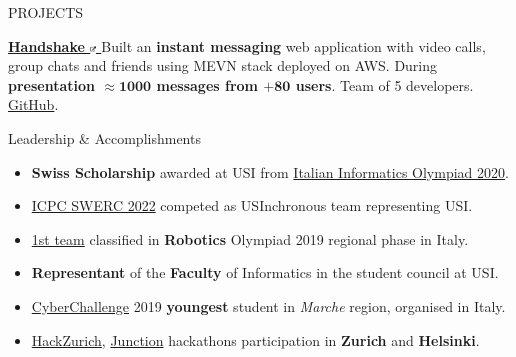 \documentclass{cv} %
\def\intraexpvspace{0.15cm}
\begin{document}
\begin{minipage}[b][0.9\paperheight][t]{0.7\linewidth}
\begin{rSection}{PROJECTS}
    \vspace{\intraexpvspace}
    \item \textbf{\href{https://handshakeapp.ch}{
            Handshake
            \includegraphics[width=0.15cm, trim={10cm -10cm 0cm 0cm}]{ext-link-icon.png}
        }}
    {Built an \textbf{instant messaging} web application with video calls, group chats and friends
        using MEVN stack deployed on AWS.
        During \textbf{presentation $\boldsymbol{\approx1000}$ messages from $\boldsymbol{+ 80}$ users}.
        Team of 5 developers.
        \href{https://github.com/ogs-at-usi/handshake}{GitHub}.
    }%
\end{rSection}
\begin{rSection}{Leadership \& Accomplishments}
    \vspace{0.2cm}
    \begin{itemize}
        \itemsep 0.2em
    \item \textbf{Swiss Scholarship} awarded at USI from 
        \href{https://www.olimpiadi-informatica.it/index.php/selezione-territoriale-20.html}{Italian Informatics Olympiad 2020}.

    \item \href{https://swerc.eu/2022/teams/}{ICPC SWERC 2022}
        competed as USInchronous team representing USI. %

    \item \href{https://www.makerslab.it/olimpiadi-robotiche-ancona-2019/}{1st team}
        classified in \textbf{Robotics} Olympiad 2019 regional phase in Italy.

    \item \textbf{Representant} of the \textbf{Faculty} of Informatics in the student council at USI.

    \item \href{https://cyberchallenge.it/}{CyberChallenge} 2019 \textbf{youngest} student
        in \textit{Marche} region, organised in Italy. 

    \item \href{https://hackzurich.com/}{HackZurich}, 
        \href{https://www.junction2023.com/}{Junction} 
        hackathons participation in \textbf{Zurich} and \textbf{Helsinki}.
    \end{itemize}
\end{rSection}

\end{minipage}
\end{document}
